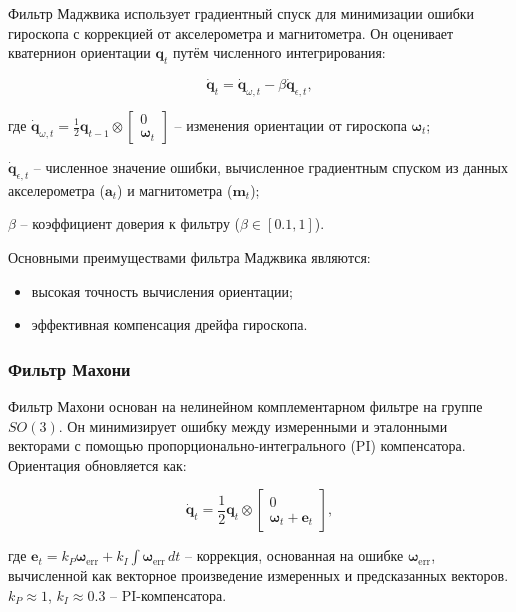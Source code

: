 {Фильтр Маджвика использует градиентный спуск для минимизации ошибки гироскопа 
с коррекцией от акселерометра и магнитометра. Он оценивает кватернион ориентации
\(\mathbf{q}_t\) путём численного интегрирования:

\begin{equation}
    \dot{\mathbf{q}}_t = \dot{\mathbf{q}}_{\omega, t} - \beta \dot{\mathbf{q}}_{\epsilon, t},
\end{equation}

\begin{explanationx}
\item[где] \(\dot{\mathbf{q}}_{\omega, t} = \frac{1}{2} \mathbf{q}_{t-1} \otimes \begin{bmatrix} 0 \\ 
\boldsymbol{\omega}_t \end{bmatrix}\) -- изменения ориентации от гироскопа \(\boldsymbol{\omega}_t\);
\item \(\dot{\mathbf{q}}_{\epsilon, t}\) -- 
	численное значение ошибки, вычисленное градиентным спуском из данных акселерометра 
	(\(\mathbf{a}_t\)) и магнитометра (\(\mathbf{m}_t\));
\item \(\beta\) -- коэффициент доверия к фильтру ($\beta \in [0.1, 1]$).
\end{explanationx}

Основными преимуществами фильтра Маджвика являются:
\begin{itemize}
	\item высокая точность вычисления ориентации;
	\item эффективная компенсация дрейфа гироскопа.
\end{itemize}

\subsubsection{Фильтр Махони}

Фильтр Махони основан на нелинейном комплементарном фильтре на группе \(SO(3)\).
Он минимизирует ошибку между измеренными и эталонными векторами с помощью пропорционально-интегрального (PI)
компенсатора. Ориентация обновляется как:

\begin{equation}
 \dot{\mathbf{q}}_t = \frac{1}{2} \mathbf{q}_t \otimes \begin{bmatrix} 0 \\ \boldsymbol{\omega}_t + \mathbf{e}_t \end{bmatrix},
\end{equation}
\begin{explanationx}
\item[где]
    \(\mathbf{e}_t = k_P \boldsymbol{\omega}_{\text{err}} + k_I \int \boldsymbol{\omega}_{\text{err}} \, dt\) --
    коррекция, основанная на ошибке \(\boldsymbol{\omega}_{\text{err}}\), 
    вычисленной как векторное произведение измеренных и предсказанных векторов.
    \(k_P \approx 1\), \(k_I \approx 0.3\) -- PI-компенсатора.
\end{explanationx}

}
